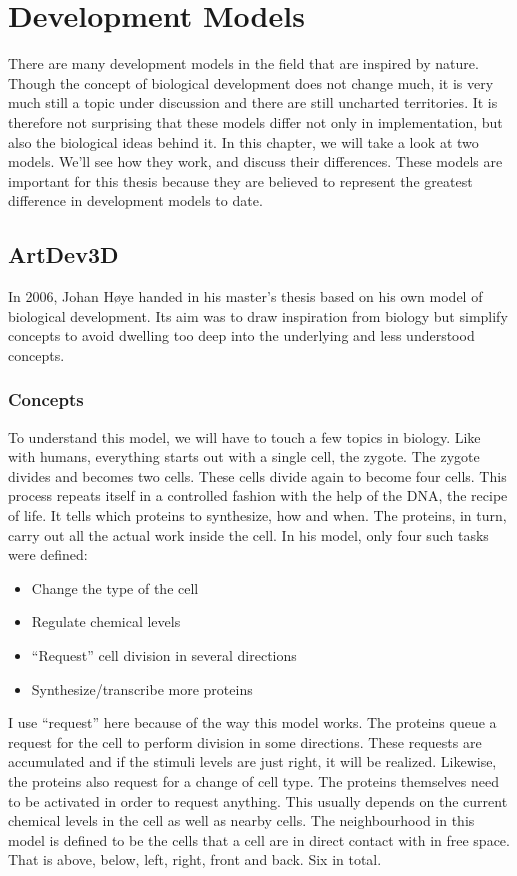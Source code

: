 \section{Development Models}
There are many development models in the field that are inspired by nature. Though the concept of biological development does not change much, it is very much still a topic under discussion and there are still uncharted territories. It is therefore not surprising that these models differ not only in implementation, but also the biological ideas behind it. In this chapter, we will take a look at two models. We'll see how they work, and discuss their differences. These models are important for this thesis because they are believed to represent the greatest difference in development models to date.

\subsection{ArtDev3D}
\label{sec:Models:ArtDev3D}
In 2006, Johan H{\o}ye handed in his master's thesis\cite{hoye2006} based on his own model of biological development. Its aim was to draw inspiration from biology but simplify concepts to avoid dwelling too deep into the underlying and less understood concepts.

\subsubsection{Concepts}
To understand this model, we will have to touch a few topics in biology. Like with humans, everything starts out with a single cell, the zygote. The zygote divides and becomes two cells. These cells divide again to become four cells. This process repeats itself in a controlled fashion with the help of the DNA, the recipe of life. It tells which proteins to synthesize, how and when. The proteins, in turn, carry out all the actual work inside the cell. In his model, only four such tasks were defined:

\begin{itemize}
	\itemsep=0pt
	\item Change the type of the cell
	\item Regulate chemical levels
	\item ``Request'' cell division in several directions
	\item Synthesize/transcribe more proteins
\end{itemize}

I use ``request'' here because of the way this model works. The proteins queue a request for the cell to perform division in some directions. These requests are accumulated and if the stimuli levels are just right, it will be realized. Likewise, the proteins also request for a change of cell type. The proteins themselves need to be activated in order to request anything. This usually depends on the current chemical levels in the cell as well as nearby cells. The neighbourhood in this model is defined to be the cells that a cell are in direct contact with in free space. That is above, below, left, right, front and back. Six in total.

